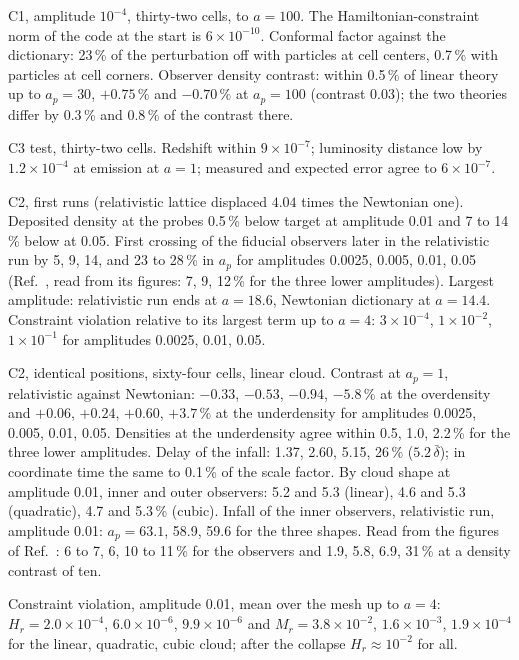 \documentclass[aps,prd,twocolumn,10pt,superscriptaddress,nofootinbib,longbibliography,floatfix]{revtex4-2}
\begin{document}
C1, amplitude $10^{-4}$, thirty-two cells, to $a = 100$. The Hamiltonian-constraint norm of the code at the start is $6\times10^{-10}$. Conformal factor against the dictionary: 23\,\% of the perturbation off with particles at cell centers, 0.7\,\% with particles at cell corners. Observer density contrast: within 0.5\,\% of linear theory up to $a_p = 30$, $+0.75\,\%$ and $-0.70\,\%$ at $a_p = 100$ (contrast 0.03); the two theories differ by 0.3\,\% and 0.8\,\% of the contrast there.

C3 test, thirty-two cells. Redshift within $9\times10^{-7}$; luminosity distance low by $1.2\times10^{-4}$ at emission at $a = 1$; measured and expected error agree to $6\times10^{-7}$.

C2, first runs (relativistic lattice displaced $4.04$ times the Newtonian one). Deposited density at the probes 0.5\,\% below target at amplitude 0.01 and 7 to 14\,\% below at 0.05. First crossing of the fiducial observers later in the relativistic run by 5, 9, 14, and 23 to 28\,\% in $a_p$ for amplitudes 0.0025, 0.005, 0.01, 0.05 (Ref.~\cite{East:2019chx}, read from its figures: 7, 9, 12\,\% for the three lower amplitudes). Largest amplitude: relativistic run ends at $a = 18.6$, Newtonian dictionary at $a = 14.4$. Constraint violation relative to its largest term up to $a = 4$: $3\times10^{-4}$, $1\times10^{-2}$, $1\times10^{-1}$ for amplitudes 0.0025, 0.01, 0.05.

C2, identical positions, sixty-four cells, linear cloud. Contrast at $a_p = 1$, relativistic against Newtonian: $-0.33$, $-0.53$, $-0.94$, $-5.8\,\%$ at the overdensity and $+0.06$, $+0.24$, $+0.60$, $+3.7\,\%$ at the underdensity for amplitudes 0.0025, 0.005, 0.01, 0.05. Densities at the underdensity agree within 0.5, 1.0, 2.2\,\% for the three lower amplitudes. Delay of the infall: 1.37, 2.60, 5.15, 26\,\% ($5.2\,\bar\delta$); in coordinate time the same to 0.1\,\% of the scale factor. By cloud shape at amplitude 0.01, inner and outer observers: 5.2 and 5.3 (linear), 4.6 and 5.3 (quadratic), 4.7 and 5.3\,\% (cubic). Infall of the inner observers, relativistic run, amplitude 0.01: $a_p = 63.1$, 58.9, 59.6 for the three shapes. Read from the figures of Ref.~\cite{East:2019chx}: 6 to 7, 6, 10 to 11\,\% for the observers and 1.9, 5.8, 6.9, 31\,\% at a density contrast of ten.

Constraint violation, amplitude 0.01, mean over the mesh up to $a = 4$: $H_r = 2.0\times10^{-4}$, $6.0\times10^{-6}$, $9.9\times10^{-6}$ and $M_r = 3.8\times10^{-2}$, $1.6\times10^{-3}$, $1.9\times10^{-4}$ for the linear, quadratic, cubic cloud; after the collapse $H_r \approx 10^{-2}$ for all.
\end{document}
